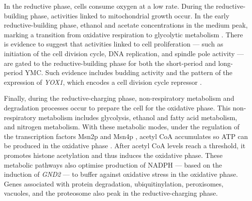 In the reductive phase, cells consume oxygen at a low rate.
During the reductive-building phase, activities linked to mitochondrial growth occur.
In the early reductive-building phase, ethanol and acetate concentrations in the medium peak, marking a transition from oxidative respiration to glycolytic metabolism \parencite{tuCyclicChangesMetabolic2007}.
There is evidence to suggest that activities linked to cell proliferation --- such as initiation of the cell division cycle, DNA replication, and spindle pole activity --- are gated to the reductive-building phase for both the short-period and long-period YMC\@.
Such evidence includes budding activity and the pattern of the expression of \textit{YOX1}, which encodes a cell division cycle repressor \parencite{tuLogicYeastMetabolic2005}.

Finally, during the reductive-charging phase,
non-respiratory metabolism and degradation processes occur to prepare the cell for the oxidative phase.
This non-respiratory metabolism includes glycolysis, ethanol and fatty acid metabolism, and nitrogen metabolism.
With these metabolic modes, under the regulation of the transcription factors Msn2p and Msn4p \parencite{kuangMsn2RegulateExpression2017}, acetyl CoA accumulates so ATP can be produced in the oxidative phase \parencite{tuLogicYeastMetabolic2005}.
After acetyl CoA levels reach a threshold, it promotes histone acetylation and thus induces the oxidative phase.
These metabolic pathways also optimise production of NADPH --- based on the induction of \textit{GND2} --- to buffer against oxidative stress in the oxidative phase.
Genes associated with protein degradation, ubiquitinylation, peroxisomes, vacuoles, and the proteosome also peak in the reductive-charging phase.

